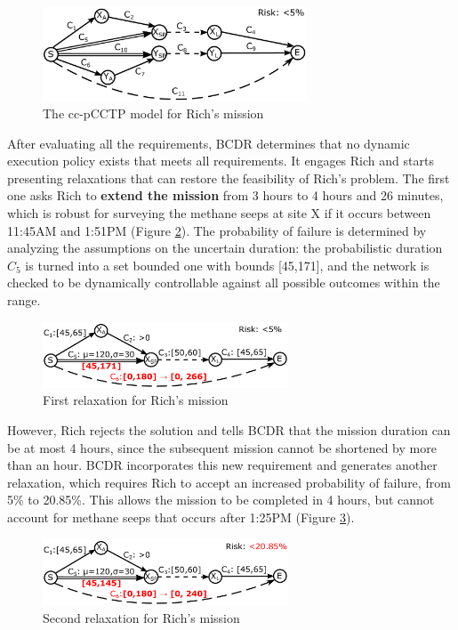 \documentclass[jair,twoside,11pt,theapa]{article}
\begin{document}
\begin{figure}[htb]
	\centering
	\includegraphics[width=0.7\textwidth]{figures/ccpstp_example.pdf}
	\caption{The cc-pCCTP model for Rich's mission}
	\label{fig:sample_ccpctp}
\end{figure}

After evaluating all the requirements, BCDR determines that no dynamic
execution policy exists that meets all requirements. It engages Rich and starts
presenting relaxations that can restore the feasibility of Rich's problem. The
first one asks Rich to \textbf{extend the mission} from 3 hours to 4 hours and 26
minutes, which is robust for surveying the methane seeps at site X if it occurs between 11:45AM
and 1:51PM (Figure \ref{fig:sample_ccpstp_sol1}). The probability of failure is determined by analyzing the assumptions on the uncertain duration: the probabilistic duration $C_5$ is turned into a set bounded one with bounds [45,171], and the network is checked to be dynamically controllable against all possible outcomes within the range.

\begin{figure}[htb]
	\centering
	\includegraphics[width=0.65\textwidth]{figures/ccpstp_example_s1.pdf}
	\caption{First relaxation for Rich's mission}
	\label{fig:sample_ccpstp_sol1}
\end{figure}

However, Rich rejects the solution and tells BCDR that the mission duration can
be at most 4 hours, since the subsequent mission cannot be shortened by more
than an hour. BCDR incorporates this new requirement and generates another
relaxation, which requires Rich to accept an increased probability of failure, from 5\% to 20.85\%. This allows
the mission to be completed in 4 hours, but cannot account for methane seeps that
occurs after 1:25PM (Figure \ref{fig:sample_ccpstp_sol2}).

\begin{figure}[htb!]
	\centering
	\includegraphics[width=0.65\textwidth]{figures/ccpstp_example_s2.pdf}
	\caption{Second relaxation for Rich's mission}
	\label{fig:sample_ccpstp_sol2}
\end{figure}
\end{document}
